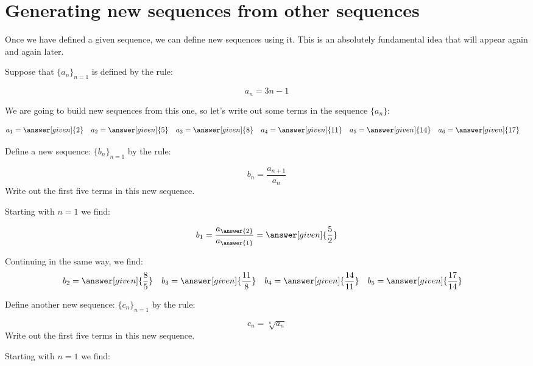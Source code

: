 \documentclass{ximera}
\begin{document}
\section{Generating new sequences from other sequences}

Once we have defined a given sequence, we can define new sequences using it.  This is an absolutely fundamental idea that will appear again and again later.

\begin{example}
Suppose that $\{a_n\}_{n=1}$ is defined by the rule:

\[
a_n = 3n-1
\]

We are going to build new sequences from this one, so let's write out some terms in the sequence $\{a_n\}$:

    \begin{align*}
      a_1 &= \answer[given]{2} & 
      a_2 &= \answer[given]{5} & 
      a_3 &= \answer[given]{8} & 
      a_4 &= \answer[given]{11} & 
      a_5 &= \answer[given]{14}  & 
      a_6 &= \answer[given]{17} 
    \end{align*}

\begin{example}
Define a new sequence: $\{b_n\}_{n=1}$ by the rule:

\[
b_n = \frac{a_{n+1}}{a_n} 
\]
Write out the first five terms in this new sequence.

\begin{explanation}
Starting with $n=1$ we find:

\[      b_1 = \frac{a_{\answer{2}}}{a_{\answer{1}}} = \answer[given]{\frac{5}{2}}       \]
      
Continuing in the same way, we find:     
     \begin{align*}
      	b_2 &=  \answer[given]{\frac{8}{5}}  & 
	b_3 &= \answer[given]{\frac{11}{8}}  & 
	b_4 &= \answer[given]{\frac{14}{11}}  & 
	b_5 &=  \answer[given]{\frac{17}{14}}  & 
    \end{align*}
    
\end{explanation}
    
\end{example}

\begin{example}
Define another new sequence: $\{c_n\}_{n=1}$ by the rule:

\[
c_n = \sqrt[n]{a_n} 
\]
Write out the first five terms in this new sequence.

\begin{explanation}
Starting with $n=1$ we find:


\end{explanation}
\end{example}
\end{example}
\end{document}
